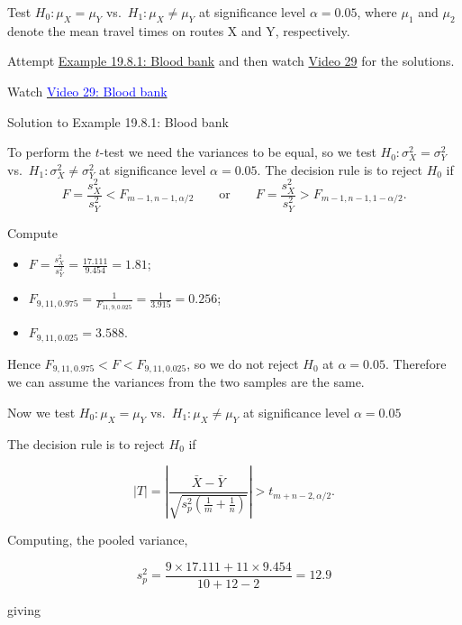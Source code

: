 \documentclass[
]{book}
\providecommand{\tightlist}{%
  \setlength{\itemsep}{0pt}\setlength{\parskip}{0pt}}
\begin{document}
Test \(H_0: \mu_X = \mu_Y\) vs.~\(H_1: \mu_X \neq \mu_Y\) at significance level \(\alpha=0.05\), where \(\mu_1\) and \(\mu_2\) denote the mean travel times on routes X and Y, respectively.

Attempt \protect\hyperlink{Sec_Hypo_Test:exer:bloodbank}{Example 19.8.1: Blood bank} and then watch \protect\hyperlink{video29}{Video 29} for the solutions.

Watch \href{https://mediaspace.nottingham.ac.uk/media/Blood+Bank+Example+FINAL+VERSION/1_04t6341p}{\textcolor{blue}{Video 29: Blood bank}}

Solution to Example 19.8.1: Blood bank

To perform the \(t\)-test we need the variances to be equal, so we test \(H_0: \sigma_X^2 = \sigma_Y^2\) vs.~\(H_1: \sigma_X^2 \neq \sigma_Y^2\) at significance level \(\alpha=0.05\). The decision rule is to reject \(H_0\) if\\

\[F = \frac{s_X^2}{s_Y^2} < F_{m-1,n-1,\alpha/2} \qquad \text{or} \qquad F = \frac{s_X^2}{s_Y^2} > F_{m-1,n-1,1-\alpha/2}.\]

Compute

\begin{itemize}
\tightlist
\item
  \(F = \frac{s_X^2}{s_Y^2} = \frac{17.111}{9.454} = 1.81\);\\
\item
  \(F_{9,11,0.975} = \frac{1}{F_{11,9,0.025}} = \frac{1}{3.915} = 0.256\);\\
\item
  \(F_{9,11,0.025} = 3.588\).
\end{itemize}

Hence \(F_{9,11,0.975} < F < F_{9,11,0.025}\), so we do not reject \(H_0\) at \(\alpha = 0.05\). Therefore we can assume the variances from the two samples are the same.

Now we test \(H_0: \mu_X = \mu_Y\) vs.~\(H_1: \mu_X \neq \mu_Y\) at significance level \(\alpha = 0.05\)

The decision rule is to reject \(H_0\) if

\[|T| = \left| \frac{\bar{X} - \bar{Y} }{ \sqrt{s_p^2 \left(\frac{1}{m} + \frac{1}{n} \right) }} \right| > t_{m+n-2,\alpha/2}.\]

Computing, the pooled variance,

\[s_p^2 = \frac{9 \times 17.111 + 11 \times 9.454}{10+12-2} = 12.9\]

giving\\
\end{document}
